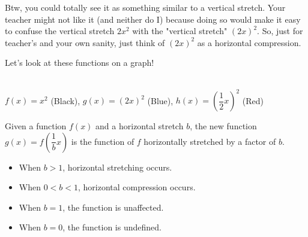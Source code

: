 Btw, you could totally see it as something similar to a vertical stretch. Your teacher might not like it (and neither do I) because doing so would make it easy to confuse the vertical stretch $2x^2$ with the "vertical stretch" $(2x)^2$. So, just for teacher's and your own sanity, just think of $(2x)^2$ as a horizontal compression.

Let's look at these functions on a graph!
\begin{center}
    \\
    $f(x) = x^2$ (Black), $g(x) = (2x)^2$ (Blue), $\displaystyle h(x) = \left(\dfrac{1}{2}x\right)^2$ (Red)
\end{center}

\begin{definition}
    Given a function $f(x)$ and a horizontal stretch $b$, the new function $\displaystyle g(x) = f\left(\dfrac{1}{b}x\right)$ is the function of $f$ horizontally stretched by a factor of $b$.
    \begin{itemize}
        \item When $b > 1$, horizontal stretching occurs.
        \item When $0 < b < 1$, horizontal compression occurs.
        \item When $b = 1$, the function is unaffected.
        \item When $b = 0$, the function is undefined.
    \end{itemize}
\end{definition}